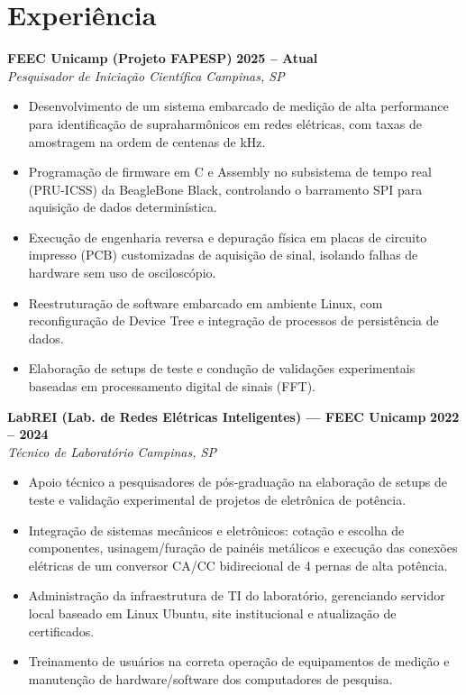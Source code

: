 \documentclass[a4paper,11pt]{article}
\newcommand{\entry}[4]{%
  \noindent\textbf{#1} \hfill \textbf{#2}\\
  \textit{#3} \hfill \textit{#4}
  \vspace{3pt}
}
\newcommand{\entrygap}{\vspace{9pt}}
\begin{document}
\section*{Experiência}

\entry{FEEC Unicamp (Projeto FAPESP)}{2025 -- Atual}{Pesquisador de Iniciação Científica}{Campinas, SP}
\begin{itemize}
\item Desenvolvimento de um sistema embarcado de medição de alta performance para identificação de supraharmônicos em redes elétricas, com taxas de amostragem na ordem de centenas de kHz.
\item Programação de firmware em C e Assembly no subsistema de tempo real (PRU-ICSS) da BeagleBone Black, controlando o barramento SPI para aquisição de dados determinística.
\item Execução de engenharia reversa e depuração física em placas de circuito impresso (PCB) customizadas de aquisição de sinal, isolando falhas de hardware sem uso de osciloscópio.
\item Reestruturação de software embarcado em ambiente Linux, com reconfiguração de Device Tree e integração de processos de persistência de dados.
\item Elaboração de setups de teste e condução de validações experimentais baseadas em processamento digital de sinais (FFT).
\end{itemize}
\entrygap

\entry{LabREI (Lab. de Redes Elétricas Inteligentes) --- FEEC Unicamp}{2022 -- 2024}{Técnico de Laboratório}{Campinas, SP}
\begin{itemize}
\item Apoio técnico a pesquisadores de pós-graduação na elaboração de setups de teste e validação experimental de projetos de eletrônica de potência.
\item Integração de sistemas mecânicos e eletrônicos: cotação e escolha de componentes, usinagem/furação de painéis metálicos e execução das conexões elétricas de um conversor CA/CC bidirecional de 4 pernas de alta potência.
\item Administração da infraestrutura de TI do laboratório, gerenciando servidor local baseado em Linux Ubuntu, site institucional e atualização de certificados.
\item Treinamento de usuários na correta operação de equipamentos de medição e manutenção de hardware/software dos computadores de pesquisa.
\end{itemize}
\entrygap
\end{document}
